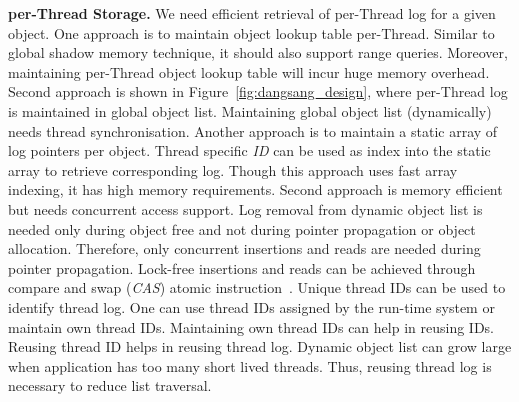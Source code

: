 \textbf{per-Thread Storage.} 
We need efficient retrieval of per-Thread log for a given object. One approach is to maintain object lookup table per-Thread. Similar to global shadow memory technique, it should also support range queries. Moreover, maintaining per-Thread object lookup table will incur huge memory overhead. Second approach is shown in Figure~\ref{fig:dangsang_design}, where per-Thread log is maintained in global object list. Maintaining global object list (dynamically) needs thread synchronisation. Another approach is to maintain a static array of log pointers per object. Thread specific \emph{ID} can be used as index into the static array to retrieve corresponding log. Though this approach uses fast array indexing, it has high memory requirements. Second approach is memory efficient but needs concurrent access support. Log removal from dynamic object list is needed only during object free and not during pointer propagation or object allocation. Therefore, only concurrent insertions and reads are needed during pointer propagation. Lock-free insertions and reads can be achieved through compare and swap (\emph{CAS}) atomic instruction~\cite{valois1995lock}. Unique thread IDs can be used to identify thread log. One can use thread IDs assigned by the run-time system or maintain own thread IDs. Maintaining own thread IDs can help in reusing IDs. Reusing thread ID helps in reusing thread log. Dynamic object list can grow large when application has too many short lived threads. Thus, reusing thread log is necessary to reduce list traversal. \\ %


